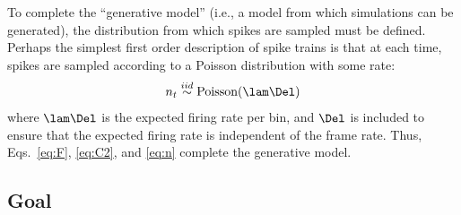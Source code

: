 To complete the ``generative model'' (i.e., a model from which simulations can be generated), the distribution from which spikes are sampled must be defined.  Perhaps the simplest first order description of spike trains is that at each time, spikes are sampled according to a Poisson distribution with some rate:
\begin{align} \label{eq:n}
	n_t \overset{iid}{\sim} \text{Poisson}(\lam \Del)
\end{align}
\noindent where $\lam \Del$ is the expected firing rate per bin, and $\Del$ is included to ensure that the expected firing rate is independent of the frame rate.  Thus, Eqs.~\eqref{eq:F}, \eqref{eq:C2}, and \eqref{eq:n} complete the generative model.  






\subsection{Goal} \label{sec:goal}

